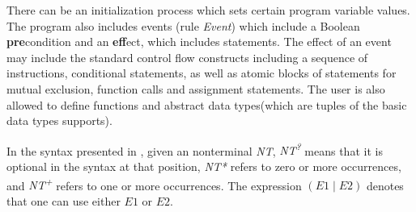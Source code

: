There can be an initialization process which sets certain program variable values.
The program also includes events (rule \emph{Event}) which include a Boolean \textbf{pre}condition
and an \textbf{eff}ect, which includes statements.
The effect of an event may include the standard control flow constructs including a sequence of instructions,
conditional statements, as well as atomic blocks of statements for mutual exclusion, function calls and assignment statements.
The user is also allowed to define functions and abstract data types(which are tuples of the basic data types \lgname supports).

In the syntax presented in , given an nonterminal \textit{NT},
{\it NT\textsuperscript{?}} means that it is optional in the syntax at that position,
{\it NT*} refers to zero or more occurrences,
and {\it NT\textsuperscript{+}} refers to one or more occurrences.
The expression $(E1\mid E2)$ denotes that one can use either $E1$ or $E2$.

